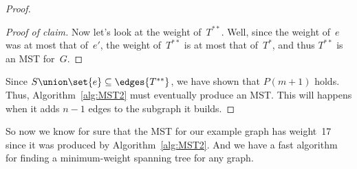 \begin{proof}
\begin{proof}[Proof of claim]
Now let's look at the weight of~$T^{**}$.  Well, since the weight
of~$e$ was at most that of~$e'$, the weight of~$T^{**}$ is at most
that of~$T^*$, and thus $T^{**}$ is an MST for~$G$.
\end{proof}

Since $S \union \set{e} \subseteq \edges{T^{**}}$, we have shown that
  $P(m + 1)$ holds.  Thus, Algorithm~\ref{alg:MST2} must eventually
  produce an MST\@.  This will happens when it adds $n - 1$ edges to
  the subgraph it builds.
\end{proof}

So now we know for sure that the MST for our example graph has
weight~17 since it was produced by Algorithm~\ref{alg:MST2}.  And we
have a fast algorithm for finding a minimum-weight spanning tree for
any graph.

\begin{problems}
\classproblems
{}

\homeworkproblems
{}
\end{problems}


\begin{problems}
\classproblems
{}


\homeworkproblems
{}

\examproblems
{}

\end{problems}


\begin{problems}
\classproblems
{}

\examproblems
{}

\homeworkproblems
{}
\end{problems}

